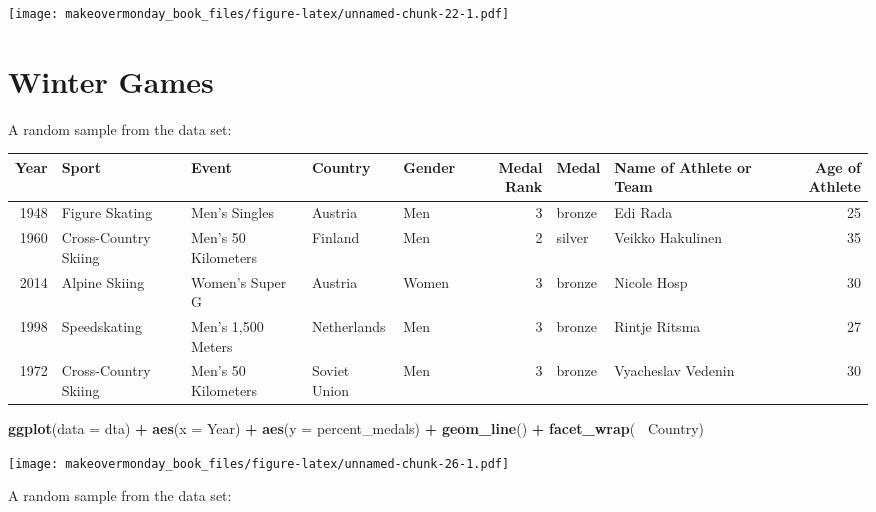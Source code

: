 \documentclass[]{book}
\newenvironment{Shaded}{\begin{snugshade}}{\end{snugshade}}
\newcommand{\KeywordTok}[1]{\textcolor[rgb]{0.13,0.29,0.53}{\textbf{#1}}}
\newcommand{\DataTypeTok}[1]{\textcolor[rgb]{0.13,0.29,0.53}{#1}}
\newcommand{\StringTok}[1]{\textcolor[rgb]{0.31,0.60,0.02}{#1}}
\newcommand{\OperatorTok}[1]{\textcolor[rgb]{0.81,0.36,0.00}{\textbf{#1}}}
\newcommand{\NormalTok}[1]{#1}
\theoremstyle{definition}
\theoremstyle{definition}
\theoremstyle{definition}
\theoremstyle{remark}
\begin{document}
\texttt{[image: makeovermonday\_book\_files/figure-latex/unnamed-chunk-22-1.pdf]}

\chapter{Winter Games}\label{winter-games}

A random sample from the data set:

\begin{tabular}{r|l|l|l|l|r|l|l|r}
\hline
Year & Sport & Event & Country & Gender & Medal Rank & Medal & Name of Athlete or Team & Age of Athlete\\
\hline
1948 & Figure Skating & Men's Singles & Austria & Men & 3 & bronze & Edi Rada & 25\\
\hline
1960 & Cross-Country Skiing & Men's 50 Kilometers & Finland & Men & 2 & silver & Veikko Hakulinen & 35\\
\hline
2014 & Alpine Skiing & Women's Super G & Austria & Women & 3 & bronze & Nicole Hosp & 30\\
\hline
1998 & Speedskating & Men's 1,500 Meters & Netherlands & Men & 3 & bronze & Rintje Ritsma & 27\\
\hline
1972 & Cross-Country Skiing & Men's 50 Kilometers & Soviet Union & Men & 3 & bronze & Vyacheslav Vedenin & 30\\
\hline
\end{tabular}

\begin{Shaded}
\begin{Highlighting}[]
\KeywordTok{ggplot}\NormalTok{(}\DataTypeTok{data =}\NormalTok{ dta) }\OperatorTok{+}\StringTok{ }
\StringTok{  }\KeywordTok{aes}\NormalTok{(}\DataTypeTok{x =}\NormalTok{ Year) }\OperatorTok{+}
\StringTok{  }\KeywordTok{aes}\NormalTok{(}\DataTypeTok{y =}\NormalTok{ percent_medals) }\OperatorTok{+}
\StringTok{  }\KeywordTok{geom_line}\NormalTok{() }\OperatorTok{+}\StringTok{ }
\StringTok{  }\KeywordTok{facet_wrap}\NormalTok{(}\OperatorTok{~}\StringTok{ }\NormalTok{Country)}
\end{Highlighting}
\end{Shaded}

\texttt{[image: makeovermonday\_book\_files/figure-latex/unnamed-chunk-26-1.pdf]}

A random sample from the data set:
\end{document}

